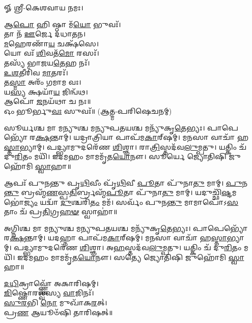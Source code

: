 
𑍐 𑌶𑍍𑌰𑍀-𑌕𑍇𑌶𑌵𑌾𑌯 𑌨𑌮𑌃।

𑌆\-\ul{𑌪𑍋} 𑌹𑌿 𑌷𑍍𑌠𑌾 𑌮᳴\-\ul{𑌯𑍋} 𑌭𑍁𑌵𑌃᳴।\\
𑌤𑌾 𑌨᳴ \ul{𑌊}\-𑌰𑍍𑌜𑍇 𑌦᳴𑌧𑌾𑌤𑌨।\\
\-\ul{𑌮}\-𑌹𑍇𑌰𑌣𑌾᳴\-\ul{𑌯} 𑌚𑌕𑍍𑌷᳴𑌸𑍇।\\
𑌯𑍋 𑌵𑌃᳴ \ul{𑌶𑌿}\-𑌵𑌤᳴\-\ul{𑌮𑍋} 𑌰𑌸𑌃᳴।\\
𑌤𑌸𑍍𑌯᳴ 𑌭𑌾𑌜𑌯\-\ul{𑌤𑍇}\-𑌹 𑌨𑌃᳴।\\
\-\ul{𑌉}\-\-\ul{𑌶}\-𑌤𑍀𑌰𑌿᳴𑌵 \ul{𑌮𑌾}\-𑌤𑌰𑌃᳴।\\
𑌤\-\ul{𑌸𑍍𑌮𑌾} 𑌅𑌰𑌂᳴ 𑌗𑌮𑌾𑌮 𑌵𑌃।\\
𑌯\-\ul{𑌸𑍍𑌯} 𑌕𑍍𑌷𑌯𑌾᳴\-\ul{𑌯} 𑌜𑌿𑌨𑍍𑌵᳴𑌥।\\
𑌆𑌪𑍋᳴ \ul{𑌜}\-𑌨𑌯᳴𑌥𑌾 𑌚 𑌨𑌃॥\\

𑌓𑌂 𑌭𑍂𑌰𑍍𑌭𑍁\-\ul{𑌵𑌃} 𑌸𑍁𑌵𑌃᳴॥ (𑌆𑌤𑍍𑌮-𑌪𑌰𑌿𑌷𑍇𑌚𑌨𑌮𑍍)

𑌸𑍂𑌰𑍍𑌯𑌶𑍍𑌚 𑌮𑌾 𑌮𑌨𑍍𑌯𑍁𑌶𑍍𑌚 𑌮𑌨𑍍𑌯𑍁𑌪𑌤𑌯𑌶𑍍𑌚 𑌮𑌨𑍍𑌯𑍁᳴𑌕𑍃\-\ul{𑌤𑍇}\-𑌭𑍍𑌯𑌃। 𑌪𑌾𑌪𑍇𑌭𑍍𑌯𑍋᳴ 𑌰\-\ul{𑌕𑍍𑌷}\-𑌨𑍍𑌤𑌾𑌮𑍍। 𑌯𑌦𑍍𑌰𑌾𑌤𑍍𑌰𑌿𑌯𑌾 𑌪𑌾𑌪᳴𑌮\-\ul{𑌕𑌾}\-𑌰𑍍‌𑌷𑌮𑍍। 𑌮𑌨𑌸𑌾 𑌵𑌾𑌚𑌾᳴ 𑌹\-\ul{𑌸𑍍𑌤𑌾}\-𑌭𑍍𑌯𑌾𑌮𑍍। 𑌪𑌦𑍍𑌭𑍍𑌯𑌾𑌮𑍁𑌦𑌰𑍇᳴𑌣 \ul{𑌶𑌿}\-𑌶𑍍𑌞𑌾। 𑌰𑌾\-\ul{𑌤𑍍𑌰𑌿}\-𑌸𑍍𑌤𑌦᳴𑌵\-\ul{𑌲𑍁}\-𑌮𑍍𑌪𑌤𑍁। 𑌯𑌤𑍍𑌕𑌿𑌂 𑌚᳴ 𑌦𑍁\-\ul{𑌰𑌿}\-𑌤𑌂 𑌮𑌯𑌿᳴। 𑌇𑌦𑌮𑌹𑌂 𑌮𑌾𑌮𑌮𑍃᳴𑌤\-\ul{𑌯𑍋}\-𑌨𑍗। 𑌸𑍂𑌰𑍍𑌯𑍇 𑌜𑍍𑌯𑍋𑌤𑌿𑌷𑌿 𑌜𑍁𑌹𑍋᳴𑌮𑌿 \ul{𑌸𑍍𑌵𑌾}\-𑌹𑌾॥


𑌆𑌪𑌃᳴ 𑌪𑍁𑌨𑌨𑍍𑌤𑍁 𑌪𑍃\-\ul{𑌥𑌿}\-𑌵𑍀𑌂 𑌪𑍃᳴\-\ul{𑌥𑌿}\-𑌵𑍀 \ul{𑌪𑍂}\-𑌤𑌾 𑌪𑍁᳴𑌨𑌾\-\ul{𑌤𑍁} 𑌮𑌾𑌮𑍍। \ul{𑌪𑍁}\-𑌨\-\ul{𑌨𑍍𑌤𑍁} 𑌬𑍍𑌰𑌹𑍍𑌮᳴\-\ul{𑌣}\-𑌸𑍍𑌪\-\ul{𑌤𑌿}\-𑌰𑍍𑌬𑍍𑌰𑌹𑍍𑌮᳴\-\ul{𑌪𑍂}\-𑌤𑌾 𑌪𑍁᳴𑌨𑌾\-\ul{𑌤𑍁} 𑌮𑌾𑌮𑍍। 𑌯𑌦𑍁𑌚𑍍𑌛𑌿᳴\-\ul{𑌷𑍍𑌟}\-𑌮𑌭𑍋॑\-\ul{𑌜𑍍𑌯𑌂} 𑌯𑌦𑍍𑌵𑌾᳴ \ul{𑌦𑍁}\-𑌶𑍍𑌚𑌰𑌿᳴\-\ul{𑌤𑌂} 𑌮𑌮᳴। 𑌸𑌰𑍍𑌵𑌂᳴ 𑌪𑍁𑌨\-\ul{𑌨𑍍𑌤𑍁} 𑌮𑌾𑌮𑌾𑌪𑍋᳴𑌽\-\ul{𑌸}\-𑌤𑌾𑌂 𑌚᳴ 𑌪𑍍𑌰\-\ul{𑌤𑌿}\-𑌗𑍍𑌰\-\ul{𑌹}\-\-\ul{𑍟} 𑌸𑍍𑌵𑌾𑌹𑌾॑॥


𑌅𑌗𑍍𑌨𑌿𑌶𑍍𑌚 𑌮𑌾 𑌮𑌨𑍍𑌯𑍁𑌶𑍍𑌚 𑌮𑌨𑍍𑌯𑍁𑌪𑌤𑌯𑌶𑍍𑌚 𑌮𑌨𑍍𑌯𑍁᳴𑌕𑍃\-\ul{𑌤𑍇}\-𑌭𑍍𑌯𑌃। 𑌪𑌾𑌪𑍇𑌭𑍍𑌯𑍋᳴ 𑌰\-\ul{𑌕𑍍𑌷}\-𑌨𑍍𑌤𑌾𑌮𑍍। 𑌯𑌦𑌹𑍍𑌨𑌾 𑌪𑌾𑌪᳴𑌮\-\ul{𑌕𑌾}\-𑌰𑍍‌𑌷𑌮𑍍। 𑌮𑌨𑌸𑌾 𑌵𑌾𑌚𑌾᳴ 𑌹\-\ul{𑌸𑍍𑌤𑌾}\-𑌭𑍍𑌯𑌾𑌮𑍍। 𑌪𑌦𑍍𑌭𑍍𑌯𑌾𑌮𑍁𑌦𑌰𑍇᳴𑌣 \ul{𑌶𑌿}\-𑌶𑍍𑌞𑌾। 𑌅\-\ul{𑌹}\-𑌸𑍍𑌤𑌦᳴𑌵\-\ul{𑌲𑍁}\-𑌮𑍍𑌪𑌤𑍁। 𑌯𑌤𑍍𑌕𑌿𑌂 𑌚᳴ 𑌦𑍁\-\ul{𑌰𑌿}\-𑌤𑌂 𑌮𑌯𑌿᳴। 𑌇𑌦𑌮𑌹𑌂 𑌮𑌾𑌮𑌮𑍃᳴𑌤\-\ul{𑌯𑍋}\-𑌨𑍗। 𑌸𑌤𑍍𑌯𑍇 𑌜𑍍𑌯𑍋𑌤𑌿𑌷𑌿 𑌜𑍁𑌹𑍋᳴𑌮𑌿 \ul{𑌸𑍍𑌵𑌾}\-𑌹𑌾॥



\-\ul{𑌦}\-\-\ul{𑌧𑌿}\-𑌕𑍍𑌰𑌾𑌵𑍍𑌣𑍍𑌣𑍋᳴ 𑌅𑌕𑌾𑌰𑌿𑌷𑌮𑍍।\\
 \ul{𑌜𑌿}\-𑌷𑍍𑌣𑍋𑌰𑌶𑍍𑌵᳴𑌸𑍍𑌯 \ul{𑌵𑌾}\-𑌜𑌿𑌨𑌃᳴।\\
\-\ul{𑌸𑍁}\-\-\ul{𑌰}\-𑌭𑌿 \ul{𑌨𑍋} 𑌮𑍁𑌖𑌾᳴𑌕\-\ul{𑌰}\-𑌤𑍍।\\
𑌪𑍍𑌰\-\ul{𑌣} 𑌆𑌯𑍂𑍞᳴𑌷𑌿 𑌤𑌾𑌰𑌿𑌷𑌤𑍍॥\\



